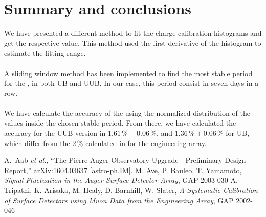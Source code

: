 \documentclass[twoside, final, 10pt]{articleMine}
\begin{document}
\section{Summary and conclusions}
We have presented a different method to fit the charge
calibration histograms and get the respective \qpkvem value. This
method used the first derivative of the histogram to estimate the
fitting range.\\\\
A sliding window method has been implemented to find the most
stable period for the \qpkvem, in both UB and UUB. In our case,
this period consist in seven days in a row.\\\\
We have calculate the accuracy of the \qpkvem using the
normalized distribution of the \qpkvem values inside the chosen
stable period. From there, we have calculated the accuracy for
the UUB version in $1.61\,\%\pm0.06\,\%$, and
$1.36\,\%\pm0.06\,\%$ for UB, which differ from the $2\,\%$
calculated in \cite{gap2002-046} for the engineering array.


\begin{thebibliography}{}
  \setlength{\itemsep}{0.0pt}
      A.~Aab \textit{et al.}, ``The Pierre Auger Observatory
      Upgrade - Preliminary Design Report,'' arXiv:1604.03637
      [astro-ph.IM].
     M. Ave, P. Bauleo, T. Yamamoto,
      {\em Signal Fluctuation in the Auger Surface Detector
      Array}, GAP 2003-030
     A. Tripathi, K. Arisaka, M. Healy, D.
      Barnhill, W. Slater, {\em A Systematic Calibration of
      Surface Detectors using Muon Data from the Engineering
      Array}, GAP 2002-046

\end{thebibliography}
\end{document}
